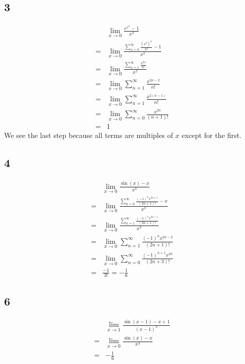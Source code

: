 \documentclass[12pt]{article}
\newcommand{\round}[1]{\left(       #1 \right)      }
\begin{document}
\subsection*{3}
\begin{align*}
     & \lim_{x\to0} \frac{e^{x^2} - 1}{x^2} \\
    =& \lim_{x\to0} \frac{\sum_{n=0}^\infty \frac{\round{x^2}^n}{n!} - 1}{x^2} \\
    =& \lim_{x\to0} \frac{\sum_{n=1}^\infty \frac{x^{2n}}{n!}}{x^2} \\
    =& \lim_{x\to0} \sum_{n=1}^\infty \frac{x^{2n-2}}{n!} \\
    =& \lim_{x\to0} \sum_{n=1}^\infty \frac{x^{2(n-1)}}{n!} \\
    =& \lim_{x\to0} \sum_{n=0}^\infty \frac{x^{2n}}{(n+1)!} \\
    =& 1
\end{align*}
We see the last step because all terms are multiples of $x$ except for the first.



\subsection*{4}
\begin{align*}
     & \lim_{x\to0} \frac{\sin(x) - x}{x^3} \\
    =& \lim_{x\to0} \frac{\sum_{n=0}^\infty \frac{(-1)^n x^{2n+1}}{(2n+1)!} - x}{x^3} \\
    =& \lim_{x\to0} \frac{\sum_{n=1}^\infty \frac{(-1)^n x^{2n+1}}{(2n+1)!}}{x^3} \\
    =& \lim_{x\to0} \sum_{n=1}^\infty \frac{(-1)^n x^{2n-2}}{(2n+1)!} \\
    =& \lim_{x\to0} \sum_{n=0}^\infty \frac{(-1)^{n+1} x^{2n}}{(2n+3)!} \\
    =& \frac{-1}{3!} = -\frac{1}{6}
\end{align*}



\subsection*{6}
\begin{align*}
     & \lim_{x\to1} \frac{\sin(x-1) - x + 1}{(x-1)^3} \\
    =& \lim_{x\to0} \frac{\sin(x) - x}{x^3} \\
    =& -\frac{1}{6}
\end{align*}
\end{document}
